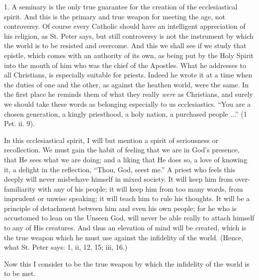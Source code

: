 1. A seminary is the only true guarantee for the
creation of the ecclesiastical spirit. And this is the primary and
true weapon for meeting the age, not controversy. Of course every
Catholic should have an intelligent appreciation of his religion, as
St. Peter says, but still controversy is not the instrument by which
the world is to be resisted and overcome. And this we shall see if we
study that epistle, which comes with an authority of its own, as being
put by the Holy Spirit into the mouth of him who was the chief of the
Apostles. What he addresses to all Christians, is especially
suitable for priests. Indeed he wrote it at a time when the duties of
one and the other, as against the heathen world, were the same. In the
first place he reminds them of what they really \emph{were} as
Christians, and surely we should take these words as belonging
especially to us ecclesiastics. ``You are a chosen generation, a kingly
priesthood, a holy nation, a purchased people ...'' (1 Pet. ii. 9).

In this ecclesiastical spirit, I will but mention
a spirit of seriousness or recollection. We must gain the habit of
feeling that we are in God's presence, that He sees what we are doing;
and a liking that He does so, a love of knowing it, a delight in the
reflection, ``Thou, God, seest me.'' A priest who feels this deeply will
never misbehave himself in mixed society. It will keep him from
over-familiarity with any of his people; it will keep him from too
many words, from imprudent or unwise speaking; it will teach him to
rule his thoughts. It will be a principle of detachment between him
and even his own people; for he who is accustomed to lean on the
Unseen God, will never be able really to attach himself to any of His
creatures. And thus an elevation of mind will be created, which is the
true weapon which he must use against the infidelity of the world.
(Hence, what St. Peter says: 1, ii, 12, 15; iii, 16.)

Now this I consider to be the true weapon by
which the infidelity of the world is to be met.

